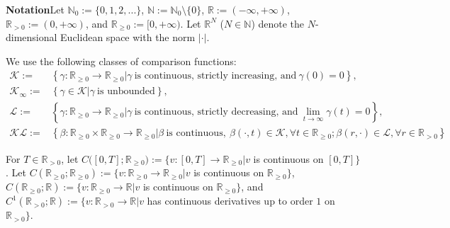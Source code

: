 \documentclass[onecolumn]{autart}
\newenvironment{proof of Prop.ODE}{{\it Proof of Proposition~\ref{Prop.ODE}:\enspace}}{\hfill $\blacksquare$\par}
\newenvironment{proof of PDE}{{\it Proof of Proposition \ref{Prop.8}:\enspace}}{\hfill $\blacksquare$\par}
\begin{document}
{	%
	
	\textbf{Notation}\quad Let ${\mathbb{N}_0}:=\{0,1,2,...\}$, ${\mathbb{N}}:=\mathbb{N}_0\setminus\{0\}$, $\mathbb{R}:=(-\infty,+\infty)$, $\mathbb{R}_{>0}:=(0,+\infty)$, and $\mathbb{R}_{\geq 0}:=[0,+\infty)$.  Let $\mathbb{R}^N$ (${N}\in\mathbb{N}$) denote the $N$-dimensional Euclidean space with the norm $|\cdot|$.
	
	We use the following classes of comparison functions:
	\begin{align*}
		\mathcal{K}:=&\left\{\gamma:\mathbb{R}_{\geq0}\rightarrow\mathbb{R}_{\geq0}\big|\gamma\ \mbox{is continuous,\ strictly\ increasing,\ and}\ \gamma(0)=0\right\},\\
		\mathcal{K}_{\infty}:=&\left\{\gamma \in \mathcal{K}\big|\gamma\ \mbox{is unbounded}\right\},\\
		\mathcal{L}:=&\left\{\gamma:\mathbb{R}_{\geq0}\rightarrow\mathbb{R}_{\geq0}\big|\gamma\ \mbox{is continuous,\ strictly\ decreasing,\ and}\ \lim_{t\rightarrow\infty }\gamma(t)=0 \right\},\\
		\mathcal{K}\mathcal{L}:=&\left\{\beta: \mathbb{R}_{\geq0}\times\mathbb{R}_{\geq0}\rightarrow\mathbb{R}_{\geq0}\big|\beta\ \mbox{is continuous},\ \beta(\cdot, t) \in \mathcal{K},\forall t\in\mathbb{R}_{\geq0};\beta(r, \cdot) \in \mathcal{L} ,\forall r\in \mathbb{R} _{>0}\right\}.
	\end{align*}
	
	
	For   $T\in \mathbb{R}_{>0}$,  let ${C([0,T]};\mathbb{R}_{\geq 0}):=\big\{v: {[0,T]} \rightarrow \mathbb{R}_{\geq 0}\big|  v$ is continuous on $[0,T]\big\}$.  Let $C(\mathbb{R}_{\geq 0};\mathbb{R}_{\geq 0}):=\big\{v: {\mathbb{R}_{\geq 0}} \rightarrow \mathbb{R}_{\geq 0}\big|  v$ is continuous on $\mathbb{R}_{\geq 0}\big\}$, $C(\mathbb{R}_{\geq 0};\mathbb{R}):=\big\{v: {\mathbb{R}_{\geq 0}} \rightarrow \mathbb{R}\big|  v$ is continuous on $\mathbb{R}_{\geq 0}\big\}$,  and $C^1 (\mathbb{R}_{>0};\mathbb{R}):=\big\{v: {\mathbb{R}_{> 0}} \rightarrow \mathbb{R}\big|  v$ has continuous derivatives up to order $1$ on $\mathbb{R}_{> 0}\big\}$.
	
}
\end{document}
